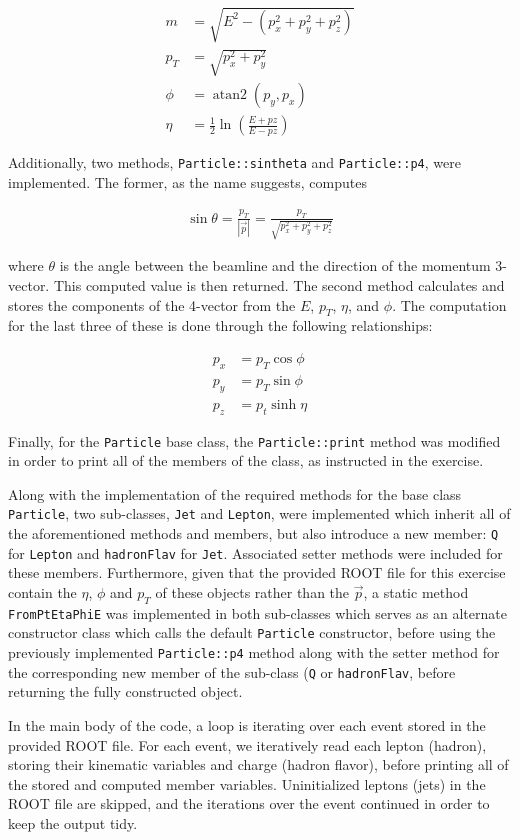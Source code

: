 \documentclass{article}
\newcounter{exercise}
\begin{document}
\begin{align*}
    m &= \sqrt{E^2 - (p_x^2 + p_y^2 + p_z^2)}\\
    p_T &= \sqrt{p_x^2 + p_y^2}\\
    \phi &=  \operatorname{atan2}(p_y, p_x)\\
    \eta &= \frac12 \ln\left(\frac{E + pz}{E - pz}\right)
\end{align*}

Additionally, two methods, \texttt{Particle::sintheta} and \texttt{Particle::p4}, were implemented. The former, as the name suggests, computes

\begin{align*}
    \sin\theta = \frac{p_T}{|\vec p|} = \frac{p_T}{\sqrt{p_x^2 + p_y^2 + p_z^2}}
\end{align*}

\noindent where $\theta$ is the angle between the beamline and the direction of the momentum 3-vector. This computed value is then returned. The second method calculates and stores the components of the 4-vector from the $E$, $p_T$, $\eta$, and $\phi$. The computation for the last three of these is done through the following relationships:

\begin{align}
    p_x &= p_T \cos\phi\\
    p_y &= p_T \sin\phi\\
    p_z &= p_t \sinh\eta
\end{align}

\noindent Finally, for the \texttt{Particle} base class, the \texttt{Particle::print} method was modified in order to print all of the members of the class, as instructed in the exercise.

Along with the implementation of the required methods for the base class \texttt{Particle}, two sub-classes, \texttt{Jet} and \texttt{Lepton}, were implemented which inherit all of the aforementioned methods and members, but also introduce a new member: \texttt{Q} for \texttt{Lepton} and \texttt{hadronFlav} for \texttt{Jet}. Associated setter methods were included for these members. Furthermore, given that the provided ROOT file for this exercise contain the $\eta$, $\phi$ and $p_T$ of these objects rather than the $\vec p$, a static method \texttt{FromPtEtaPhiE} was implemented in both sub-classes which serves as an alternate constructor class which calls the default \texttt{Particle} constructor, before using the previously implemented \texttt{Particle::p4} method along with the setter method for the corresponding new member of the sub-class (\texttt{Q} or \texttt{hadronFlav}, before returning the fully constructed object.

In the main body of the code, a loop is iterating over each event stored in the provided ROOT file. For each event, we iteratively read each lepton (hadron), storing their kinematic variables and charge (hadron flavor), before printing all of the stored and computed member variables. Uninitialized leptons (jets) in the ROOT file are skipped, and the iterations over the event continued in order to keep the output tidy.


\end{document}
